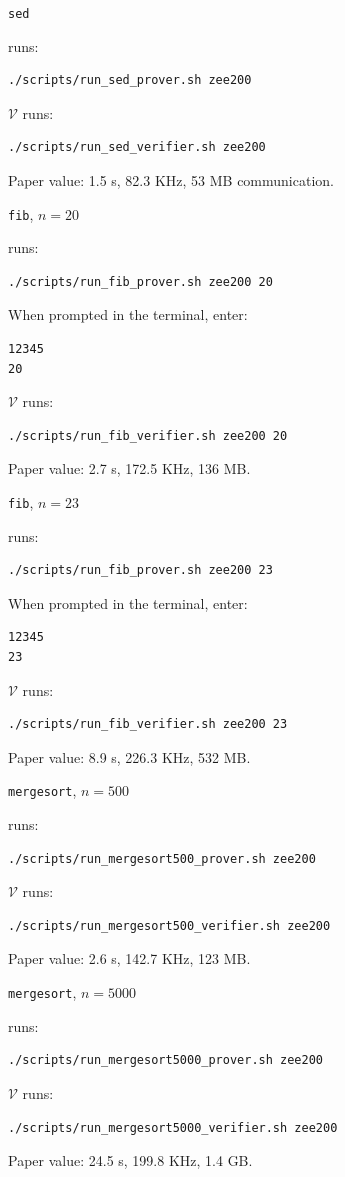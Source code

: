 \documentclass[nonacm,sigconf]{acmart}
\let\P\undefined
\newcommand{\P}{\ensuremath{\mathcal{P}}\xspace}
\newcommand{\V}{\ensuremath{\mathcal{V}}\xspace}
\begin{document}
\begin{compactitem}
\item \texttt{sed}

\P runs:
\begin{verbatim}
./scripts/run_sed_prover.sh zee200
\end{verbatim}
\V runs:
\begin{verbatim}
./scripts/run_sed_verifier.sh zee200
\end{verbatim}
Paper value: 1.5 s, 82.3 KHz, 53 MB communication.

\item \texttt{fib}, $n=20$

\P runs:
\begin{verbatim}
./scripts/run_fib_prover.sh zee200 20
\end{verbatim}
When prompted in the \P terminal, enter:
\begin{verbatim}
12345
20
\end{verbatim}
\V runs:
\begin{verbatim}
./scripts/run_fib_verifier.sh zee200 20
\end{verbatim}
Paper value: 2.7 s, 172.5 KHz, 136 MB.

\item \texttt{fib}, $n=23$

\P runs:
\begin{verbatim}
./scripts/run_fib_prover.sh zee200 23
\end{verbatim}
When prompted in the \P terminal, enter:
\begin{verbatim}
12345
23
\end{verbatim}
\V runs:
\begin{verbatim}
./scripts/run_fib_verifier.sh zee200 23
\end{verbatim}
Paper value: 8.9 s, 226.3 KHz, 532 MB.

\item \texttt{mergesort}, $n=500$

\P runs:
\begin{verbatim}
./scripts/run_mergesort500_prover.sh zee200
\end{verbatim}
\V runs:
\begin{verbatim}
./scripts/run_mergesort500_verifier.sh zee200
\end{verbatim}
Paper value: 2.6 s, 142.7 KHz, 123 MB.

\item \texttt{mergesort}, $n=5000$

\P runs:
\begin{verbatim}
./scripts/run_mergesort5000_prover.sh zee200
\end{verbatim}
\V runs:
\begin{verbatim}
./scripts/run_mergesort5000_verifier.sh zee200
\end{verbatim}
Paper value: 24.5 s, 199.8 KHz, 1.4 GB.


\end{compactitem}
\end{document}
